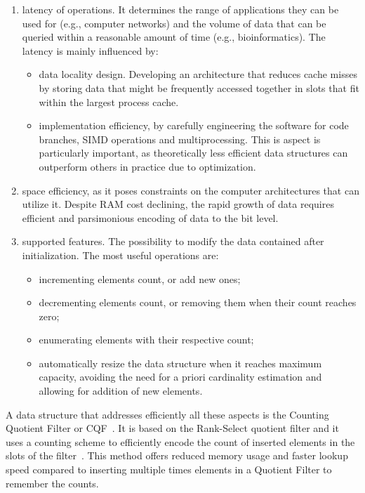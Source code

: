 \begin{enumerate}
	\item latency of \memb operations. It determines the range of applications they can be used for (e.g., computer networks) and the volume of data that can be queried within a reasonable amount of time (e.g., bioinformatics). The latency is mainly influenced by:
	\begin{itemize}
		\item data locality design. Developing an architecture that reduces cache misses by storing data that might be frequently accessed together in slots that fit within the largest process cache.
		\item implementation efficiency, by carefully engineering the software for code branches, SIMD operations and multiprocessing. This is aspect is particularly important, as theoretically less efficient data structures can outperform others in practice due to optimization.
	\end{itemize}
	\item space efficiency, as it poses constraints on the computer architectures that can utilize it. Despite RAM cost declining, the rapid growth of data requires efficient and parsimonious encoding of data to the bit level.
	\item supported features. The possibility to modify the data contained after initialization. The most useful operations are:
	\begin{itemize}
		\item incrementing elements count, or add new ones; 
		\item decrementing elements count, or removing them when their count reaches zero;
		\item enumerating elements with their respective count;
		\item automatically resize the data structure when it reaches maximum capacity, avoiding the need for a priori cardinality estimation and allowing for addition of new elements. 
	\end{itemize}
\end{enumerate}
A data structure that addresses efficiently all these aspects is the Counting Quotient Filter or \gls{CQF}~\cite{cqf}. It is based on the Rank-Select quotient filter and it uses a counting scheme to efficiently encode the count of inserted elements in the slots of the filter~\cite{cqf}. This method offers reduced memory usage and faster lookup speed compared to inserting multiple times elements in a Quotient Filter to remember the counts.

